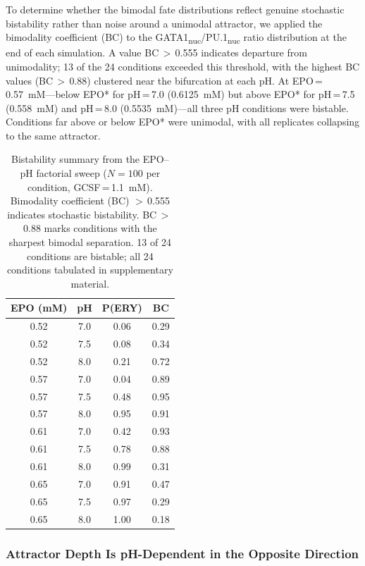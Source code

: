 To determine whether the bimodal fate distributions reflect genuine stochastic
bistability rather than noise around a unimodal attractor, we applied the
bimodality coefficient (BC) to the GATA1\textsubscript{nuc}/PU.1\textsubscript{nuc}
ratio distribution at the end of each simulation. A value BC\,$>$\,0.555 indicates
departure from unimodality; 13 of the 24 conditions exceeded this threshold, with
the highest BC values (BC\,$>$\,0.88) clustered near the bifurcation at each pH.
At EPO\,=\,0.57~mM---below EPO* for pH\,=\,7.0 (0.6125~mM) but above EPO*
for pH\,=\,7.5 (0.558~mM) and pH\,=\,8.0 (0.5535~mM)---all three pH
conditions were bistable. Conditions far above or below EPO* were
unimodal, with all replicates collapsing to the same attractor.

\begin{table}[ht]
\caption{Bistability summary from the EPO--pH factorial sweep ($N=100$ per
condition, GCSF\,=\,1.1~mM). Bimodality coefficient (BC) $>$\,0.555 indicates
stochastic bistability. BC\,$>$\,0.88 marks conditions with the sharpest
bimodal separation. 13 of 24 conditions are bistable; all 24 conditions
tabulated in supplementary material.}
\label{tab:bistability}
\centering
\small
\begin{tabularx}{\linewidth}{@{}cccc@{}}
\toprule
\textbf{EPO (mM)} & \textbf{pH} & \textbf{P(ERY)} & \textbf{BC} \\
\midrule
0.52 & 7.0  & 0.06 & 0.29 \\
0.52 & 7.5  & 0.08 & 0.34 \\
0.52 & 8.0  & 0.21 & 0.72 \\
0.57 & 7.0  & 0.04 & 0.89 \\
0.57 & 7.5  & 0.48 & 0.95 \\
0.57 & 8.0  & 0.95 & 0.91 \\
0.61 & 7.0  & 0.42 & 0.93 \\
0.61 & 7.5  & 0.78 & 0.88 \\
0.61 & 8.0  & 0.99 & 0.31 \\
0.65 & 7.0  & 0.91 & 0.47 \\
0.65 & 7.5  & 0.97 & 0.29 \\
0.65 & 8.0  & 1.00 & 0.18 \\
\bottomrule
\end{tabularx}
\end{table}

\subsubsection*{Attractor Depth Is pH-Dependent in the Opposite Direction}

